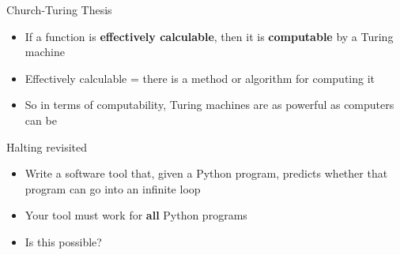 \begin{frame}{Church-Turing Thesis}
	\begin{itemize}
		\pause\item If a function is \textbf{effectively calculable}, then it is \textbf{computable} by a Turing machine
		\pause\item Effectively calculable = there is a method or algorithm for computing it
		\pause\item So in terms of computability, Turing machines are as powerful as computers can be
	\end{itemize}
\end{frame}

\begin{frame}{Halting revisited}
	\begin{itemize}
		\pause\item Write a software tool that, given a Python program, predicts whether that program can go into an infinite loop
		\pause\item Your tool must work for \textbf{all} Python programs
		\pause\item Is this possible?
	\end{itemize}
\end{frame}
